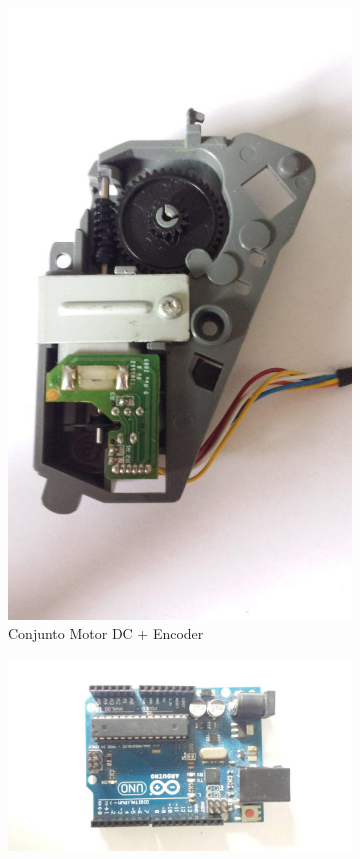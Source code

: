 \documentclass[a4paper,11pt]{article}
\begin{document}
\begin{figure}[H]
    \centering
    \begin{subfigure}[b]{0.32\linewidth}
        \centering
        \includegraphics[width=0.8\linewidth]{src/tex/img/servomotor.jpg}
        \caption{Conjunto Motor DC + Encoder}
    \end{subfigure}
    \hfill
    \begin{subfigure}[b]{0.32\linewidth}
        \centering
        \includegraphics[height=0.9\linewidth, angle=90]{src/tex/img/arduinoUNO.jpg}

\end{subfigure}
\end{figure}
\end{document}

